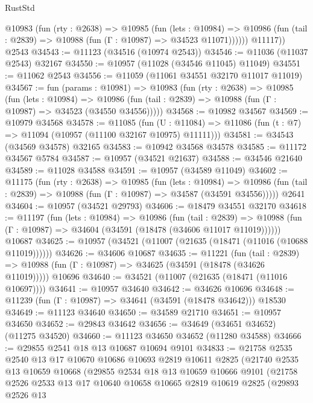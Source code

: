 \begin{lexlean}{RustStd}
\begin{coremodule}
          @10983
            (fun (rty : @2638) =>
            @10985
              (fun (lets : @10984) =>
              @10986 (fun (tail : @2839) => @10988 (fun (Γ : @10987) => @34523 @11071))))))
        @11117))
    @2543
@34543 := @11123 (@34516 (@10974 @2543))
@34546 := @11036 (@11037 @2543) @32167
@34550 := @10957 (@11028 (@34546 @11045) @11049)
@34551 := @11062 @2543
@34556 := @11059 (@11061 @34551 @32170 @11017 @11019)
@34567 := fun (params : @10981) =>
  @10983
    (fun (rty : @2638) =>
    @10985
      (fun (lets : @10984) =>
      @10986 (fun (tail : @2839) => @10988 (fun (Γ : @10987) => @34523 (@34550 @34556)))))
@34568 := @10982 @34567
@34569 := @10979 @34568
@34578 := @11085
    (fun (U : @11084) => @11086 (fun (t : @7) => @11094 (@10957 (@11100 @32167 @10975) @11111)))
@34581 := @34543 (@34569 @34578) @32165
@34583 := @10942 @34568 @34578
@34585 := @11172 @34567 @5784
@34587 := @10957 (@34521 @21637)
@34588 := @34546 @21640
@34589 := @11028 @34588
@34591 := @10957 (@34589 @11049)
@34602 := @11175
    (fun (rty : @2638) =>
    @10985
      (fun (lets : @10984) =>
      @10986 (fun (tail : @2839) => @10988 (fun (Γ : @10987) => @34587 (@34591 @34556)))))
    @2641
@34604 := @10957 (@34521 @29793)
@34606 := @18479 @34551 @32170
@34618 := @11197
    (fun (lets : @10984) =>
    @10986
      (fun (tail : @2839) =>
      @10988 (fun (Γ : @10987) => @34604 (@34591 (@18478 (@34606 @11017 @11019))))))
    @10687
@34625 := @10957 (@34521 (@11007 (@21635 (@18471 (@11016 (@10688 @11019))))))
@34626 := @34606 @10687
@34635 := @11221
    (fun (tail : @2839) => @10988 (fun (Γ : @10987) => @34625 (@34591 (@18478 (@34626 @11019)))))
    @10696
@34640 := @34521 (@11007 (@21635 (@18471 (@11016 @10697))))
@34641 := @10957 @34640
@34642 := @34626 @10696
@34648 := @11239 (fun (Γ : @10987) => @34641 (@34591 (@18478 @34642))) @18530
@34649 := @11123 @34640
@34650 := @34589 @21710
@34651 := @10957 @34650
@34652 := @29843 @34642
@34656 := @34649 (@34651 @34652) (@11275 @34520)
@34660 := @11123 @34650 @34652 (@11280 @34588)
@34666 := @29855 @2541 @18 @13 @10687 @10694 @9101
@34833 := @21758
    @2535
    @2540
    @13
    @17
    @10670
    @10686
    @10693
    @2819
    @10611
    @2825
    (@21740
      @2535
      @13
      @10659
      @10668
      (@29855
        @2534
        @18
        @13
        @10659
        @10666
        @9101
        (@21758
          @2526
          @2533
          @13
          @17
          @10640
          @10658
          @10665
          @2819
          @10619
          @2825
          (@29893
            @2526
            @13

\end{coremodule}
\end{lexlean}
